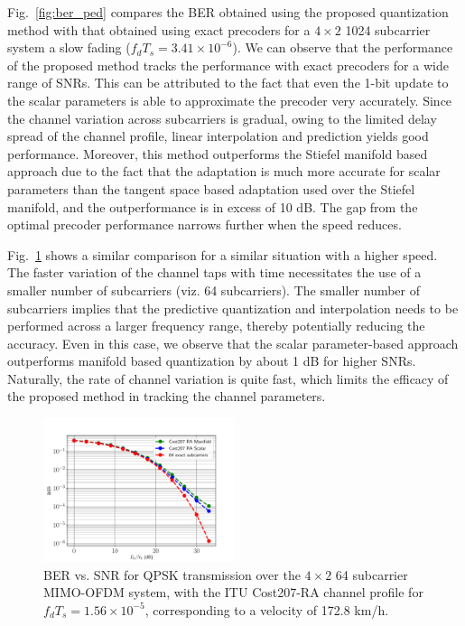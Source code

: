 \documentclass[journal,10pt,twocolumn]{IEEEtran}
\begin{document}
Fig.~\ref{fig:ber_ped} compares the BER obtained using the proposed
quantization method with that obtained using exact precoders for a
$4\times 2$ 1024 subcarrier system a slow fading
($f_dT_s = 3.41 \times 10^{-6}$). We can observe that the performance
of the proposed method tracks the performance with exact precoders for
a wide range of SNRs. This can be attributed to the fact that even the
1-bit update to the scalar parameters is able to approximate the
precoder very accurately. Since the channel variation across
subcarriers is gradual, owing to the limited delay spread of the
channel profile, linear interpolation and prediction yields good
performance. Moreover, this method outperforms the Stiefel manifold
based approach due to the fact that the adaptation is much more
accurate for scalar parameters than the tangent space based adaptation
used over the Stiefel manifold, and the outperformance is in excess of
10 dB. The gap from the optimal precoder performance narrows further
when the speed reduces.

Fig.~\ref{fig:ber_veh} shows a similar comparison for a similar
situation with a higher speed. The faster variation of the channel
taps with time necessitates the use of a smaller number of subcarriers
(viz. 64 subcarriers). The smaller number of subcarriers implies that
the predictive quantization and interpolation needs to be performed
across a larger frequency range, thereby potentially reducing the
accuracy. Even in this case, we observe that the scalar
parameter-based approach outperforms manifold based quantization by
about 1 dB for higher SNRs. Naturally, the rate of channel variation
is quite fast, which limits the efficacy of the proposed method in
tracking the channel parameters.

\begin{figure}
\includegraphics[width=0.5\textwidth]{images/ber64_001}
\caption{BER vs. SNR for QPSK transmission over the $4\times 2$ 64
  subcarrier MIMO-OFDM system, with the ITU Cost207-RA channel profile
  for $f_dT_s = 1.56\times 10^{-5}$, corresponding to a velocity of 172.8 km/h.}
\label{fig:ber_veh}
\end{figure}
\end{document}
